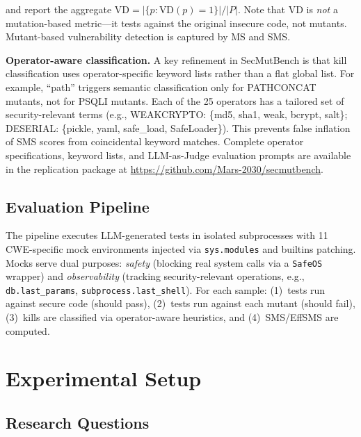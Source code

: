 \documentclass[sigconf,anonymous,review]{acmart}
\begin{document}
\noindent and report the aggregate $\text{VD} = |\{p : \text{VD}(p) = 1\}| / |P|$. Note that VD is \emph{not} a mutation-based metric---it tests against the original insecure code, not mutants. Mutant-based vulnerability detection is captured by MS and SMS.

\textbf{Operator-aware classification.} A key refinement in SecMutBench is that kill classification uses operator-specific keyword lists rather than a flat global list. For example, ``path'' triggers semantic classification only for \textsc{PATHCONCAT} mutants, not for \textsc{PSQLI} mutants. Each of the 25 operators has a tailored set of security-relevant terms (e.g., \textsc{WEAKCRYPTO}: \{md5, sha1, weak, bcrypt, salt\}; \textsc{DESERIAL}: \{pickle, yaml, safe\_load, SafeLoader\}). This prevents false inflation of SMS scores from coincidental keyword matches. Complete operator specifications, keyword lists, and LLM-as-Judge evaluation prompts are available in the replication package at \url{https://github.com/Mars-2030/secmutbench}.


\subsection{Evaluation Pipeline}

The pipeline executes LLM-generated tests in isolated subprocesses with 11 CWE-specific mock environments injected via \texttt{sys.modules} and builtins patching. Mocks serve dual purposes: \emph{safety} (blocking real system calls via a \texttt{SafeOS} wrapper) and \emph{observability} (tracking security-relevant operations, e.g., \texttt{db.last\_params}, \texttt{subprocess.last\_shell}). For each sample: (1)~tests run against secure code (should pass), (2)~tests run against each mutant (should fail), (3)~kills are classified via operator-aware heuristics, and (4)~SMS/EffSMS are computed.



\section{Experimental Setup}\label{sec:setup}

\subsection{Research Questions}
\end{document}
